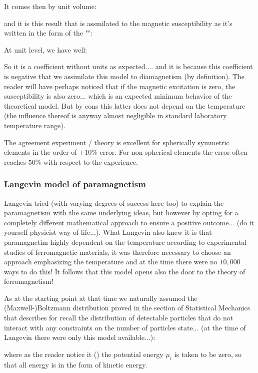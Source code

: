 	It comes then by unit volume:
	
	and it is this result that is assmilated to the magnetic susceptibility as it's written in the form of the "":
	
	At unit level, we have well:
	
	So it is a coefficient without units as expected.... and it is because this coefficient is negative that we assimilate this model to diamagnetism (by definition). The reader will have perhaps noticed that if the magnetic excitation is zero, the susceptibility is also zero... which is an expected minimum behavior of the theoretical model. But by cons this latter does not depend on the temperature (the influence thereof is anyway almost negligible in standard laboratory temperature range).

	The agreement experiment / theory is excellent for spherically symmetric elements in the order of $\pm 10\%$ error. For non-spherical elements the error often reaches $50\%$ with respect to the experience.
	
	\pagebreak
	\subsubsection{Langevin model of paramagnetism}
	Langevin tried (with varying degrees of success here too) to explain the paramagnetism with the same underlying ideas, but however by opting for a completely different mathematical approach to ensure a positive outcome... (do it yourself physicist way of life...). What Langevin also knew it is that paramagnetim highly dependent on the temperature according to experimental studies of ferromagnetic materials, it was therefore necessary to choose an approach emphasizing the temperature and at the time there were no $10,000$ ways to do this! It follows that this model opens also the door to the theory of ferromagnetism!

	As at the starting point at that time we naturally assumed the (Maxwell-)Boltzmann distribution proved in the section of Statistical Mechanics that describes for recall the distribution of detectable particles that do not interact with any constraints on the number of particles state... (at the time of Langevin there were only this model available...):
	
	where as the reader notice it () the potential energy $\mu_i$ is taken to be zero, so that all energy is in the form of kinetic energy.
	
